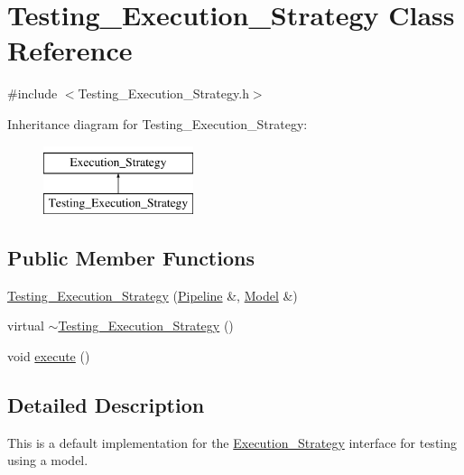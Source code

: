 \hypertarget{class_testing___execution___strategy}{
\section{Testing\_\-Execution\_\-Strategy Class Reference}
\label{class_testing___execution___strategy}
}


{\ttfamily \#include $<$Testing\_\-Execution\_\-Strategy.h$>$}

Inheritance diagram for Testing\_\-Execution\_\-Strategy:\begin{figure}[H]
\begin{center}
\leavevmode
\includegraphics[height=2cm]{class_testing___execution___strategy}
\end{center}
\end{figure}
\subsection*{Public Member Functions}
\begin{DoxyCompactItemize}
\item 
\hyperlink{class_testing___execution___strategy_a4955f2085d61c8a6154dcc5529129639}{Testing\_\-Execution\_\-Strategy} (\hyperlink{class_pipeline}{Pipeline} \&, \hyperlink{class_model}{Model} \&)
\item 
virtual \hyperlink{class_testing___execution___strategy_a83b0f026e891e3127d44d6c834c088b8}{$\sim$Testing\_\-Execution\_\-Strategy} ()
\item 
void \hyperlink{class_testing___execution___strategy_ab3d6335e164af39d38409a0bceee57c8}{execute} ()
\end{DoxyCompactItemize}


\subsection{Detailed Description}
This is a default implementation for the \hyperlink{class_execution___strategy}{Execution\_\-Strategy} interface for testing using a model. 

